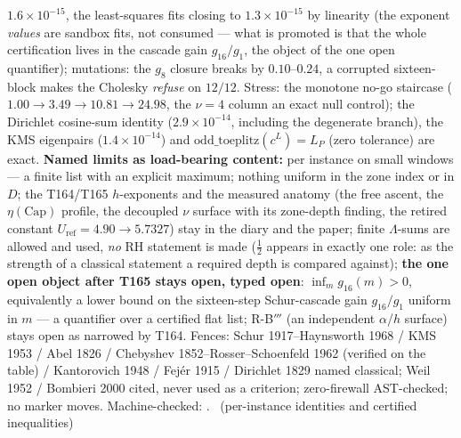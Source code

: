 \documentclass[11pt,a4paper]{article}
\begin{document}
$1.6\times10^{-15}$, the least-squares fits closing to
$1.3\times10^{-15}$ by linearity (the exponent \emph{values} are
sandbox fits, not consumed --- what is promoted is that the whole
certification lives in the cascade gain $g_{16}/g_1$, the object of
the one open quantifier); mutations: the $g_8$ closure breaks by
$0.10$--$0.24$, a corrupted sixteen-block makes the Cholesky
\emph{refuse} on $12/12$. Stress: the monotone no-go staircase
($1.00\to3.49\to10.81\to24.98$, the $\nu=4$ column an exact null
control); the Dirichlet cosine-sum identity ($2.9\times10^{-14}$,
including the degenerate branch), the KMS eigenpairs
($1.4\times10^{-14}$) and $\mathrm{odd\_toeplitz}(c^L)=L_P$ (zero
tolerance) are exact.
\textbf{Named limits as load-bearing content:} per instance on small
windows --- a finite list with an explicit maximum; nothing uniform in
the zone index or in $D$; the T164/T165 $h$-exponents and the measured
anatomy (the free ascent, the $\eta(\mathrm{Cap})$ profile, the
decoupled $\nu$ surface with its zone-depth finding, the retired
constant $U_{\mathrm{ref}}=4.90\to5.7327$) stay in the diary and the
paper; finite $\Lambda$-sums are allowed and used, \emph{no} RH
statement is made ($\tfrac12$ appears in exactly one role: as the
strength of a classical statement a required depth is compared
against); \textbf{the one open object after T165 stays open, typed
open}: $\inf_m g_{16}(m)>0$, equivalently a lower bound on the
sixteen-step Schur-cascade gain $g_{16}/g_1$ uniform in $m$ --- a
quantifier over a certified flat list; R-B$'''$ (an independent
$\alpha$/$h$ surface) stays open as narrowed by T164. Fences: Schur
1917--Haynsworth 1968 / KMS 1953 / Abel 1826 / Chebyshev
1852--Rosser--Schoenfeld 1962 (verified on the table) / Kantorovich
1948 / Fej\'er 1915 / Dirichlet 1829 named classical; Weil 1952 /
Bombieri 2000 cited, never used as a criterion; zero-firewall
AST-checked; no marker moves.
Machine-checked: .
\mE\ (per-instance identities and certified inequalities)
\end{document}
